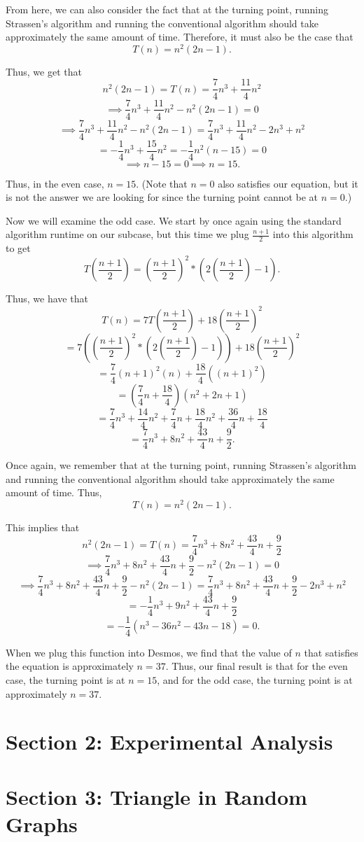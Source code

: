 \documentclass{article}
\begin{document}
From here, we can also consider the fact that at the turning point, running Strassen's algorithm and running the conventional algorithm should take approximately the same amount of time. Therefore, it must also be the case that $$T(n)=n^2(2n-1).$$

Thus, we get that $$n^2(2n-1) = T(n) = \frac{7}{4}n^3 + \frac{11}{4}n^2$$ $$\implies \frac{7}{4}n^3 + \frac{11}{4}n^2 - n^2(2n-1) = 0$$ $$\implies \frac{7}{4}n^3 + \frac{11}{4}n^2 - n^2(2n-1) = \frac{7}{4}n^3 + \frac{11}{4}n^2 - 2n^3 + n^2$$ $$=-\frac{1}{4}n^3+\frac{15}{4}n^2=-\frac{1}{4}n^2(n-15) = 0$$ $$\implies n-15=0 \implies n = 15.$$

Thus, in the even case, $n=15$. (Note that $n=0$ also satisfies our equation, but it is not the answer we are looking for since the turning point cannot be at $n=0$.)

\medskip

Now we will examine the odd case. We start by once again using the standard algorithm runtime on our subcase, but this time we plug $\frac{n+1}{2}$ into this algorithm to get $$T\left(\frac{n+1}{2}\right) = \left(\frac{n+1}{2}\right)^2*\left(2\left(\frac{n+1}{2}\right)-1\right).$$

Thus, we have that $$T(n)=7T\left(\frac{n+1}{2}\right) + 18\left(\frac{n+1}{2}\right)^2$$ $$= 7\left(\left(\frac{n+1}{2}\right)^2*\left(2\left(\frac{n+1}{2}\right)-1\right)\right) + 18\left(\frac{n+1}{2}\right)^2$$ $$=\frac{7}{4}(n+1)^2(n) + \frac{18}{4}((n+1)^2)$$ $$= \left(\frac{7}{4}n +\frac{18}{4} \right)(n^2+2n+1)$$ $$= \frac{7}{4}n^3 + \frac{14}{4}n^2 + \frac{7}{4}n +\frac{18}{4}n^2 + \frac{36}{4}n + \frac{18}{4}$$ $$=\frac{7}{4}n^3 + 8n^2 + \frac{43}{4}n + \frac{9}{2}.$$

Once again, we remember that at the turning point, running Strassen's algorithm and running the conventional algorithm should take approximately the same amount of time. Thus, $$T(n)=n^2(2n-1).$$

This implies that $$n^2(2n-1) = T(n) = \frac{7}{4}n^3 + 8n^2 + \frac{43}{4}n + \frac{9}{2}$$ $$\implies \frac{7}{4}n^3 + 8n^2 + \frac{43}{4}n + \frac{9}{2} - n^2(2n-1) = 0$$ $$ \implies \frac{7}{4}n^3 + 8n^2 + \frac{43}{4}n + \frac{9}{2} - n^2(2n-1) =  \frac{7}{4}n^3 + 8n^2 + \frac{43}{4}n + \frac{9}{2} - 2n^3 + n^2$$ $$= -\frac{1}{4}n^3 + 9n^2 + \frac{43}{4}n + \frac{9}{2}$$ $$= -\frac{1}{4}(n^3 - 36n^2 - 43n - 18) = 0.$$

When we plug this function into Desmos, we find that the value of $n$ that satisfies the equation is approximately $n=37$. Thus, our final result is that for the even case, the turning point is at $n=15$, and for the odd case, the turning point is at approximately $n=37$.

\section{Section 2: Experimental Analysis}


\section{Section 3: Triangle in Random Graphs}
\end{document}
